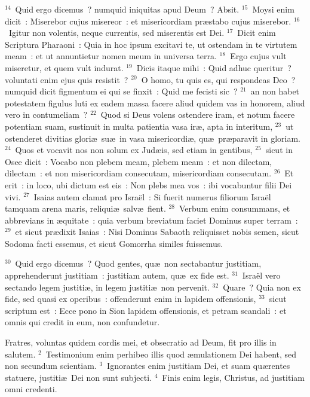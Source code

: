 ${}^{14}$~Quid ergo dicemus~? numquid iniquitas apud Deum~? Absit.
${}^{15}$~Moysi enim dicit~: Miserebor cujus misereor~: et misericordiam pr\ae stabo cujus miserebor.
${}^{16}$~Igitur non volentis, neque currentis, sed miserentis est Dei.
${}^{17}$~Dicit enim Scriptura Pharaoni~: Quia in hoc ipsum excitavi te, ut ostendam in te virtutem meam~: et ut annuntietur nomen meum in universa terra.
${}^{18}$~Ergo cujus vult miseretur, et quem vult indurat.
${}^{19}$~Dicis itaque mihi~: Quid adhuc queritur~? voluntati enim ejus quis resistit~?
${}^{20}$~O homo, tu quis es, qui respondeas Deo~? numquid dicit figmentum ei qui se finxit~: Quid me fecisti sic~?
${}^{21}$~an non habet potestatem figulus luti ex eadem massa facere aliud quidem vas in honorem, aliud vero in contumeliam~?
${}^{22}$~Quod si Deus volens ostendere iram, et notum facere potentiam suam, sustinuit in multa patientia vasa ir\ae , apta in interitum,
${}^{23}$~ut ostenderet divitias glori\ae\ su\ae\ in vasa misericordi\ae , qu\ae\ pr\ae paravit in gloriam.
${}^{24}$~Quos et vocavit nos non solum ex Jud\ae is, sed etiam in gentibus,
${}^{25}$~sicut in Osee dicit~: Vocabo non plebem meam, plebem meam~: et non dilectam, dilectam~: et non misericordiam consecutam, misericordiam consecutam.
${}^{26}$~Et erit~: in loco, ubi dictum est eis~: Non plebs mea vos~: ibi vocabuntur filii Dei vivi.
${}^{27}$~Isaias autem clamat pro Isra\"el~: Si fuerit numerus filiorum Isra\"el tamquam arena maris, reliqui\ae\ salv\ae\ fient.
${}^{28}$~Verbum enim consummans, et abbrevians in \ae quitate~: quia verbum breviatum faciet Dominus super terram~:
${}^{29}$~et sicut pr\ae dixit Isaias~: Nisi Dominus Sabaoth reliquisset nobis semen, sicut Sodoma facti essemus, et sicut Gomorrha similes fuissemus.


${}^{30}$~Quid ergo dicemus~? Quod gentes, qu\ae\ non sectabantur justitiam, apprehenderunt justitiam~: justitiam autem, qu\ae\ ex fide est.
${}^{31}$~Isra\"el vero sectando legem justiti\ae , in legem justiti\ae\ non pervenit.
${}^{32}$~Quare~? Quia non ex fide, sed quasi ex operibus~: offenderunt enim in lapidem offensionis,
${}^{33}$~sicut scriptum est~: Ecce pono in Sion lapidem offensionis, et petram scandali~: et omnis qui credit in eum, non confundetur.

\lettrine[lines=10,image=true,loversize=0.05,lraise=-0.03]{F}{}ratres, voluntas quidem cordis mei, et obsecratio ad Deum, fit pro illis in salutem.
${}^{2}$~Testimonium enim perhibeo illis quod \ae mulationem Dei habent, sed non secundum scientiam.
${}^{3}$~Ignorantes enim justitiam Dei, et suam qu\ae rentes statuere, justiti\ae\ Dei non sunt subjecti.
${}^{4}$~Finis enim legis, Christus, ad justitiam omni credenti.


